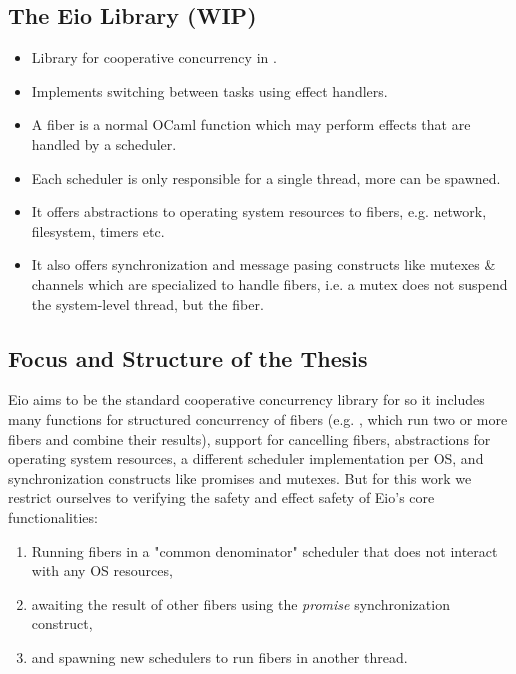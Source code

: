 \subsection{The Eio Library (WIP)}
\label{sec:intro-eio}

\begin{itemize}
  \item Library for cooperative concurrency in \ocf{}.
  \item Implements switching between tasks using effect handlers.
  \item A fiber is a normal OCaml function which may perform effects that are handled by a scheduler.
  \item Each scheduler is only responsible for a single thread, more can be spawned.
  \item It offers abstractions to operating system resources to fibers, e.g. network, filesystem, timers etc.
  \item It also offers synchronization and message pasing constructs like mutexes \& channels which are specialized to handle fibers, i.e. a mutex does not suspend the system-level thread, but the fiber.
\end{itemize}

\subsection{Focus and Structure of the Thesis}
\label{sec:intro-structure}

Eio aims to be the standard cooperative concurrency library for \ocf{} so it includes many functions for structured concurrency of fibers (e.g. , which run two or more fibers and combine their results), support for cancelling fibers, abstractions for operating system resources, a different scheduler implementation per OS, and synchronization constructs like promises and mutexes.
But for this work we restrict ourselves to verifying the safety and effect safety of Eio's core functionalities:
\begin{enumerate}
  \item Running fibers in a "common denominator" scheduler that does not interact with any OS resources,
  \item awaiting the result of other fibers using the \textit{promise} synchronization construct,
  \item and spawning new schedulers to run fibers in another thread.
\end{enumerate}


